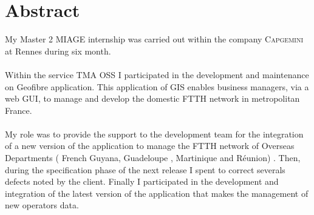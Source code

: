 \chapter*{Abstract}

My Master 2 MIAGE internship was carried out within the company \textsc{Capgemini} at Rennes during six month.
\\\\
Within the service TMA OSS I participated in the development and maintenance on Geofibre application.
This application of GIS enables business managers, via a web GUI, to manage and develop the domestic FTTH network in metropolitan France.
\\\\
My role was to provide the support to the development team for the integration of a new version of the application
to manage the FTTH network of Overseas Departments ( French Guyana, Guadeloupe , Martinique and Réunion) .
Then, during the specification phase of the next release I spent to correct severals defects noted by the client.
Finally I participated in the development and integration of the latest version of the application that makes the management of new operators data. 
